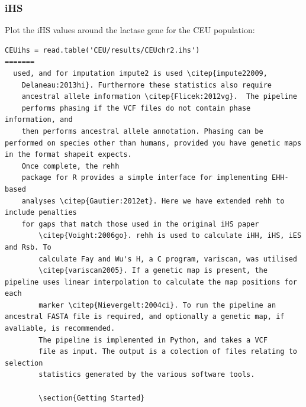 \documentclass[a4paper,10pt]{article}
\begin{document}
\subsubsection{iHS}
Plot the iHS values around the lactase gene for the CEU population:\\
\begin{verbatim}
CEUihs = read.table('CEU/results/CEUchr2.ihs')
=======
  used, and for imputation impute2 is used \citep{impute22009,
    Delaneau:2013hi}. Furthermore these statistics also require
    ancestral allele information \citep{Flicek:2012vg}.  The pipeline
    performs phasing if the VCF files do not contain phase information, and
    then performs ancestral allele annotation. Phasing can be performed on species other than humans, provided you have genetic maps in the format shapeit expects. 
    Once complete, the rehh
    package for R provides a simple interface for implementing EHH-based
    analyses \citep{Gautier:2012et}. Here we have extended rehh to include penalties
    for gaps that match those used in the original iHS paper
        \citep{Voight:2006go}. rehh is used to calculate iHH, iHS, iES and Rsb. To
        calculate Fay and Wu's H, a C program, variscan, was utilised
        \citep{variscan2005}. If a genetic map is present, the pipeline uses linear interpolation to calculate the map positions for each
        marker \citep{Nievergelt:2004ci}. To run the pipeline an ancestral FASTA file is required, and optionally a genetic map, if avaliable, is recommended. 
        The pipeline is implemented in Python, and takes a VCF
        file as input. The output is a colection of files relating to selection
        statistics generated by the various software tools.

        \section{Getting Started}

\end{verbatim}
\end{document}
